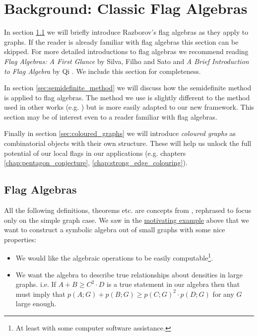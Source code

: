 \chapter{Background: Classic Flag Algebras}
\label{chap:classic_flags}

In section \ref{sec:flag_algebras} we will briefly introduce Razborov's
flag algebras as they apply to
graphs. If the reader is already familiar with flag algebras this section can be skipped.
For more detailed introductions to flag algebras we recommend reading
\textit{Flag Algebras: A First Glance} by Silva, Filho and Sato
\cite{silvaFlagAlgebrasFirst2016} and \textit{A Brief Introduction to Flag Algebra} by Qi
\cite{qiBriefIntroductionFlag}. We include this section for completeness.

In section \ref{sec:semidefinite_method} we will discuss how the semidefinite method is applied
to flag algebras.
The method we use is slightly different to the method used in other works
(e.g. \cite{silvaFlagAlgebrasFirst2016}) but is more easily adapted to our new framework. This
section may be of interest even to a reader familiar with flag algebras.

Finally in section \ref{sec:coloured_graphs} we will introduce \textit{coloured graphs} as combinatorial
objects with their own structure. These will help us unlock the full potential of
our local flags in our applications (e.g. chapters \ref{chap:pentagon_conjecture},
\ref{chap:strong_edge_colouring}).

\section{Flag Algebras}
\label{sec:flag_algebras}

All the following definitions, theorems etc.
are concepts from \cite{razborovFlagAlgebras2007}, rephrased
to focus only on the simple graph case.
We saw in the \hyperref[sec:motivating_example]{motivating example} above that we want
to construct a symbolic algebra out of small graphs with some nice properties:
\begin{itemize}
    \item We would like the algebraic operations
        to be easily computable\footnote{At least with some computer software assistance.}.
    \item We want the algebra to describe true relationships about densities in large graphs.
        i.e. If $A + B \geq C^2\cdot D$ is a true statement in our algebra
        then that must imply that $p(A; G) + p(B; G) \geq p(C; G)^2 \cdot p(D; G)$ for any $G$ large
        enough.
\end{itemize}


